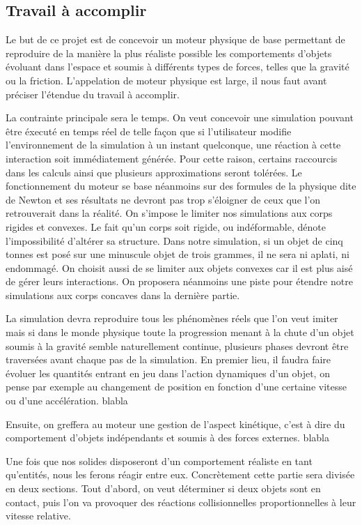 \subsection{Travail à accomplir}

Le but de ce projet est de concevoir un moteur physique de base permettant de reproduire de la manière la plus réaliste possible les comportements d'objets évoluant dans l'espace et soumis à différents types de forces, telles que la gravité ou la friction. L'appelation de moteur physique est large, il nous faut avant préciser l'étendue du travail à accomplir.

La contrainte principale sera le temps. On veut concevoir une simulation pouvant être éxecuté en temps réel de telle façon que si l'utilisateur modifie l'environnement de la simulation à un instant quelconque, une réaction à cette interaction soit immédiatement générée. Pour cette raison, certains raccourcis dans les calculs ainsi que plusieurs approximations seront tolérées. Le fonctionnement du moteur se base néanmoins sur des formules de la physique dite de Newton et ses résultats ne devront pas trop s'éloigner de ceux que l'on retrouverait dans la réalité. On s'impose le limiter nos simulations aux corps rigides et convexes. Le fait qu'un corps soit rigide, ou indéformable, dénote l'impossibilité d'altérer sa structure. Dans notre simulation, si un objet de cinq tonnes est posé sur une minuscule objet de trois grammes, il ne sera ni aplati, ni endommagé. On choisit aussi de se limiter aux objets convexes car il est plus aisé de gérer leurs interactions. On proposera néanmoins une piste pour étendre notre simulations aux corps concaves dans la dernière partie.

La simulation devra reproduire tous les phénomènes réels que l'on veut imiter mais si dans le monde physique toute la progression menant à la chute d'un objet soumis à la gravité semble naturellement continue, plusieurs phases devront être traversées avant chaque pas de la simulation. En premier lieu, il faudra faire évoluer les quantités entrant en jeu dans l'action dynamiques d'un objet, on pense par exemple au changement de position en fonction d'une certaine vitesse ou d'une accélération.  blabla

Ensuite, on greffera au moteur une gestion de l'aspect kinétique, c'est à dire du comportement d'objets indépendants et soumis à des forces externes. blabla

Une fois que nos solides disposeront d'un comportement réaliste en tant qu'entités, nous les ferons réagir entre eux. Concrètement cette partie sera divisée en deux sections. Tout d'abord, on veut déterminer si deux objets sont en contact, puis l'on va provoquer des réactions collisionnelles proportionnelles à leur vitesse relative.
